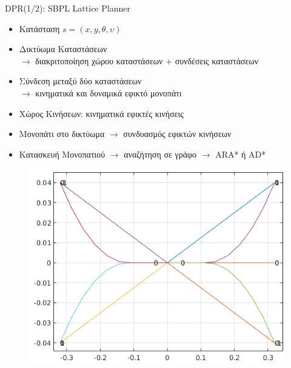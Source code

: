 \documentclass[10pt, compress, handout]{beamer} %
\begin{document}
\begin{frame}{DPR(1/2): SBPL Lattice Planner}
	\begin{itemize}
		\item Κατάσταση $s=(x,y,\theta,\upsilon)$
		\item Δικτύωμα Καταστάσεων\\$\rightarrow$ διακριτοποίηση χώρου καταστάσεων + συνδέσεις καταστάσεων
		\item Σύνδεση μεταξύ δύο καταστάσεων\\$\rightarrow$ κινηματικά και δυναμικά εφικτό μονοπάτι
		\item Χώρος Κινήσεων: κινηματικά εφικτές κινήσεις
		\item Μονοπάτι στο δικτύωμα $\rightarrow$ συνδυασμός εφικτών κινήσεων
		\item Κατασκευή Μονοπατιού $\rightarrow$ αναζήτηση σε γράφο $\rightarrow$ ARA* ή AD*
	\end{itemize}
	\begin{figure}
		\includegraphics[width=0.45\linewidth]{Figures/motion_primitives.png}
	\end{figure}
\end{frame}
\end{document}
